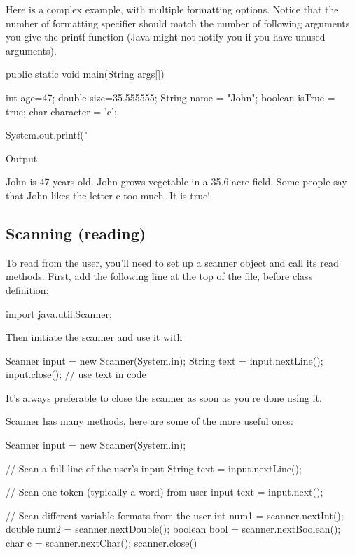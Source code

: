 Here is a complex example, with multiple formatting options. Notice that the number of formatting specifier should match the number of following arguments you give the printf function (Java might not notify you if you have unused arguments).

\begin{code}
    public static void main(String args[]) {
      int age=47;
      double size=35.555555;
      String name = "John";
      boolean isTrue = true;
      char character = 'c';

        System.out.printf("%
    }
\end{code}
Output

\begin{code}
John is 47 years old.
John grows vegetable in a 35.6 acre field.
Some people say that John likes the letter c too much.
It is true!

\end{code}

\subsection{Scanning (reading)}

To read from the user, you'll need to set up a scanner object and call its read methods. First, add the following line at the top of the file, before class definition:

\begin{code}
import java.util.Scanner; 
\end{code}

Then initiate the scanner and use it with 

\begin{code}
Scanner input = new Scanner(System.in);
String text = input.nextLine(); 
input.close();
// use text in code
\end{code}

It's always preferable to close the scanner as soon as you're done using it. 

Scanner has many methods, here are some of the more useful ones:

\begin{code}
Scanner input = new Scanner(System.in);

// Scan a full line of the user's input
String text = input.nextLine(); 

// Scan one token (typically a word) from user input
text = input.next();

// Scan different variable formats from the user
int num1 = scanner.nextInt();
double num2 = scanner.nextDouble();
boolean bool = scanner.nextBoolean();
char c = scanner.nextChar();
scanner.close()

\end{code}


